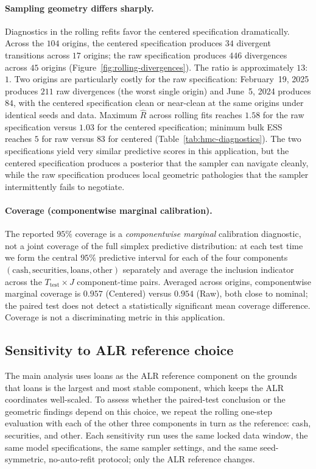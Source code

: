 \documentclass[12pt]{article}
\theoremstyle{remark}
\begin{document}
\paragraph{Sampling geometry differs sharply.}
Diagnostics in the rolling refits favor the centered specification dramatically. Across the $104$ origins, the centered specification produces $34$ divergent transitions across $17$ origins; the raw specification produces $446$ divergences across $45$ origins (Figure~\ref{fig:rolling-divergences}). The ratio is approximately $13$:$1$. Two origins are particularly costly for the raw specification: February~19, 2025 produces $211$ raw divergences (the worst single origin) and June~5, 2024 produces $84$, with the centered specification clean or near-clean at the same origins under identical seeds and data. Maximum $\widehat{R}$ across rolling fits reaches $1.58$ for the raw specification versus $1.03$ for the centered specification; minimum bulk ESS reaches $5$ for raw versus $83$ for centered (Table~\ref{tab:hmc-diagnostics}). The two specifications yield very similar predictive scores in this application, but the centered specification produces a posterior that the sampler can navigate cleanly, while the raw specification produces local geometric pathologies that the sampler intermittently fails to negotiate.

\paragraph{Coverage (componentwise marginal calibration).}
The reported $95\%$ coverage is a \emph{componentwise marginal} calibration diagnostic, not a joint coverage of the full simplex predictive distribution: at each test time we form the central $95\%$ predictive interval for each of the four components $(\text{cash}, \text{securities}, \text{loans}, \text{other})$ separately and average the inclusion indicator across the $T_{\text{test}}\times J$ component-time pairs. Averaged across origins, componentwise marginal coverage is $0.957$ (Centered) versus $0.954$ (Raw), both close to nominal; the paired test does not detect a statistically significant mean coverage difference. Coverage is not a discriminating metric in this application.

\subsection{Sensitivity to ALR reference choice}\label{sec:sensitivity}

The main analysis uses loans as the ALR reference component on the grounds that loans is the largest and most stable component, which keeps the ALR coordinates well-scaled. To assess whether the paired-test conclusion or the geometric findings depend on this choice, we repeat the rolling one-step evaluation with each of the other three components in turn as the reference: cash, securities, and other. Each sensitivity run uses the same locked data window, the same model specifications, the same sampler settings, and the same seed-symmetric, no-auto-refit protocol; only the ALR reference changes.
\end{document}
